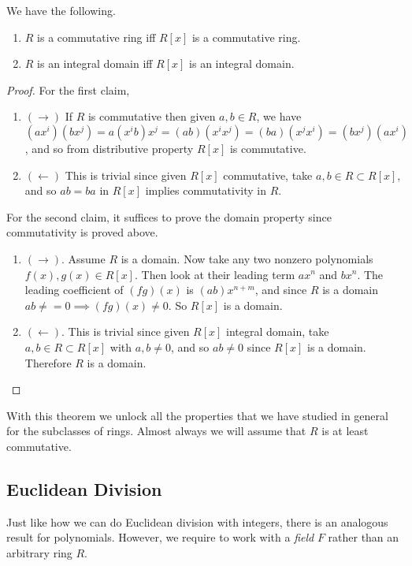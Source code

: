   \begin{lemma}
    We have the following. 
    \begin{enumerate}
      \item $R$ is a commutative ring iff $R[x]$ is a commutative ring. 
      \item $R$ is an integral domain iff $R[x]$ is an integral domain. 
    \end{enumerate}
  \end{lemma}
  \begin{proof}
    For the first claim, 
    \begin{enumerate}
      \item $(\rightarrow)$ If $R$ is commutative then given $a, b \in R$, we have $(ax^i) (b x^j) = a (x^i b) x^j = (ab)(x^i x^j) = (ba) (x^j x^i) = (b x^j) (a x^i)$, and so from distributive property $R[x]$ is commutative. 
      \item $(\leftarrow)$ This is trivial since given $R[x]$ commutative, take $a, b \in R \subset R[x]$, and so $ab = ba$ in $R[x]$ implies commutativity in $R$. 
    \end{enumerate}
    For the second claim, it suffices to prove the domain property since commutativity is proved above. 
    \begin{enumerate}
      \item $(\rightarrow)$. Assume $R$ is a domain. Now take any two nonzero polynomials $f(x), g(x) \in R[x]$. Then look at their leading term $ax^n$ and $bx^n$. The leading coefficient of $(fg)(x)$ is $(ab) x^{n+m}$, and since $R$ is a domain $ab \neq = 0 \implies (fg)(x) \neq 0$. So $R[x]$ is a domain. 
      \item $(\leftarrow)$. This is trivial since given $R[x]$ integral domain, take $a, b \in R \subset R[x]$ with $a, b \neq 0$, and so $ab \neq 0$ since $R[x]$ is a domain. Therefore $R$ is a domain. 
    \end{enumerate}
  \end{proof} 

  With this theorem we unlock all the properties that we have studied in general for the subclasses of rings. Almost always we will assume that $R$ is at least commutative. 

\subsection{Euclidean Division} 

  Just like how we can do Euclidean division with integers, there is an analogous result for polynomials. However, we require to work with a \textit{field} $F$ rather than an arbitrary ring $R$. 

